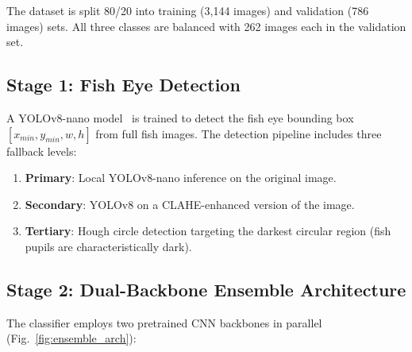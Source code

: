 \documentclass[conference]{IEEEtran}
\begin{document}
The dataset is split 80/20 into training (3,144 images) and validation (786 images) sets. All three classes are balanced with 262 images each in the validation set.

\subsection{Stage 1: Fish Eye Detection}

A YOLOv8-nano model~\cite{ref23} is trained to detect the fish eye bounding box $[x_{min}, y_{min}, w, h]$ from full fish images. The detection pipeline includes three fallback levels:
\begin{enumerate}[leftmargin=*]
    \item \textbf{Primary}: Local YOLOv8-nano inference on the original image.
    \item \textbf{Secondary}: YOLOv8 on a CLAHE-enhanced version of the image.
    \item \textbf{Tertiary}: Hough circle detection targeting the darkest circular region (fish pupils are characteristically dark).
\end{enumerate}

\subsection{Stage 2: Dual-Backbone Ensemble Architecture}

The classifier employs two pretrained CNN backbones in parallel (Fig.~\ref{fig:ensemble_arch}):
\end{document}
